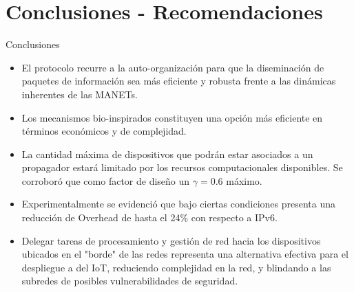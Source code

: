\section{Conclusiones - Recomendaciones}
\begin{frame}{Conclusiones}
  \begin{block}{}
   \begin{itemize}
   \justifying
    \item<1->  El protocolo recurre a la auto-organización para que la diseminación de paquetes de información sea más eficiente y robusta frente a las dinámicas inherentes de las MANETs.
    \item<1->  Los mecanismos bio-inspirados constituyen una opción más eficiente en términos económicos y de complejidad.
    \item<1-> La cantidad máxima de dispositivos que podrán estar asociados a un propagador estará limitado por los recursos computacionales disponibles. Se corroboró que como factor de diseño un $\gamma =0.6$ máximo.\\
    \item<1->  Experimentalmente se evidenció que bajo ciertas condiciones presenta una reducción de Overhead de hasta el 24\% con respecto a IPv6.\\
    \item<1->  Delegar tareas de procesamiento y gestión de red hacia los dispositivos ubicados en el "borde" de las redes representa una alternativa efectiva para el despliegue a del IoT, reduciendo complejidad en la red, y blindando a las subredes de posibles vulnerabilidades de seguridad.
    \end{itemize}
  \end{block}
\end{frame}
